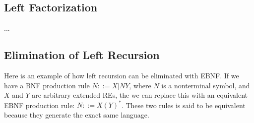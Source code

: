 \subsection*{Left Factorization}
...


\subsection*{Elimination of Left Recursion}
Here is an example of how left recursion can be eliminated with EBNF. If we have a BNF production rule $N ::= X | N Y$, where $N$ is a nonterminal symbol, and $X$ and $Y$ are arbitrary extended REs, the we can replace this with an equivalent EBNF production rule: $N ::= X (Y)^*$. These two rules is said to be equivalent because they generate the exact same language.
